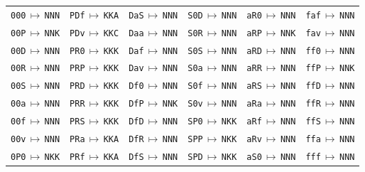 {\scriptsize
\begin{longtable}{@{}llllll@{}}
\texttt{000}\,$\mapsto$\,\texttt{NNN} & \texttt{PDf}\,$\mapsto$\,\texttt{KKA} & \texttt{DaS}\,$\mapsto$\,\texttt{NNN} & \texttt{S0D}\,$\mapsto$\,\texttt{NNN} & \texttt{aR0}\,$\mapsto$\,\texttt{NNN} & \texttt{faf}\,$\mapsto$\,\texttt{NNN} \\
\texttt{00P}\,$\mapsto$\,\texttt{NNK} & \texttt{PDv}\,$\mapsto$\,\texttt{KKC} & \texttt{Daa}\,$\mapsto$\,\texttt{NNN} & \texttt{S0R}\,$\mapsto$\,\texttt{NNN} & \texttt{aRP}\,$\mapsto$\,\texttt{NNK} & \texttt{fav}\,$\mapsto$\,\texttt{NNN} \\
\texttt{00D}\,$\mapsto$\,\texttt{NNN} & \texttt{PR0}\,$\mapsto$\,\texttt{KKK} & \texttt{Daf}\,$\mapsto$\,\texttt{NNN} & \texttt{S0S}\,$\mapsto$\,\texttt{NNN} & \texttt{aRD}\,$\mapsto$\,\texttt{NNN} & \texttt{ff0}\,$\mapsto$\,\texttt{NNN} \\
\texttt{00R}\,$\mapsto$\,\texttt{NNN} & \texttt{PRP}\,$\mapsto$\,\texttt{KKK} & \texttt{Dav}\,$\mapsto$\,\texttt{NNN} & \texttt{S0a}\,$\mapsto$\,\texttt{NNN} & \texttt{aRR}\,$\mapsto$\,\texttt{NNN} & \texttt{ffP}\,$\mapsto$\,\texttt{NNK} \\
\texttt{00S}\,$\mapsto$\,\texttt{NNN} & \texttt{PRD}\,$\mapsto$\,\texttt{KKK} & \texttt{Df0}\,$\mapsto$\,\texttt{NNN} & \texttt{S0f}\,$\mapsto$\,\texttt{NNN} & \texttt{aRS}\,$\mapsto$\,\texttt{NNN} & \texttt{ffD}\,$\mapsto$\,\texttt{NNN} \\
\texttt{00a}\,$\mapsto$\,\texttt{NNN} & \texttt{PRR}\,$\mapsto$\,\texttt{KKK} & \texttt{DfP}\,$\mapsto$\,\texttt{NNK} & \texttt{S0v}\,$\mapsto$\,\texttt{NNN} & \texttt{aRa}\,$\mapsto$\,\texttt{NNN} & \texttt{ffR}\,$\mapsto$\,\texttt{NNN} \\
\texttt{00f}\,$\mapsto$\,\texttt{NNN} & \texttt{PRS}\,$\mapsto$\,\texttt{KKK} & \texttt{DfD}\,$\mapsto$\,\texttt{NNN} & \texttt{SP0}\,$\mapsto$\,\texttt{NKK} & \texttt{aRf}\,$\mapsto$\,\texttt{NNN} & \texttt{ffS}\,$\mapsto$\,\texttt{NNN} \\
\texttt{00v}\,$\mapsto$\,\texttt{NNN} & \texttt{PRa}\,$\mapsto$\,\texttt{KKA} & \texttt{DfR}\,$\mapsto$\,\texttt{NNN} & \texttt{SPP}\,$\mapsto$\,\texttt{NKK} & \texttt{aRv}\,$\mapsto$\,\texttt{NNN} & \texttt{ffa}\,$\mapsto$\,\texttt{NNN} \\
\texttt{0P0}\,$\mapsto$\,\texttt{NKK} & \texttt{PRf}\,$\mapsto$\,\texttt{KKA} & \texttt{DfS}\,$\mapsto$\,\texttt{NNN} & \texttt{SPD}\,$\mapsto$\,\texttt{NKK} & \texttt{aS0}\,$\mapsto$\,\texttt{NNN} & \texttt{fff}\,$\mapsto$\,\texttt{NNN} \\

\end{longtable}}
